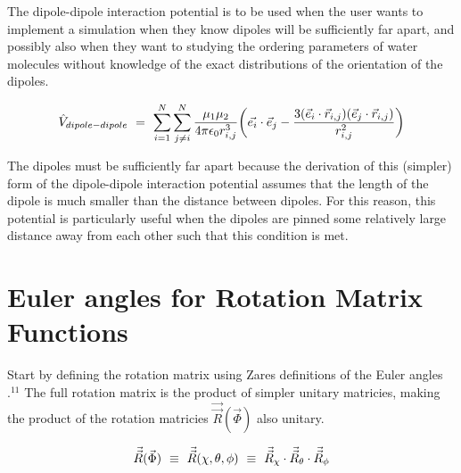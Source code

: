 \documentclass{ece}
\begin{document}
The dipole-dipole interaction potential is to be used when the user wants to implement a simulation when they know dipoles will be sufficiently far apart, and possibly also when they want to studying the ordering parameters of water molecules without knowledge of the exact distributions of the orientation of the dipoles. 

\begin{equation} \label{eq:69}
\hat{V}_{dipole-dipole} \hspace{0.125cm} = \hspace{0.125cm} \sum_{i = 1}^{N} \sum_{j \neq i}^{N} \frac{\mu_{1} \mu_{2}}{4 \pi \epsilon_{0} r_{i, j}^{3}} \bigg( \vec{e_i} \cdot \vec{e}_{j} - \frac{3(\vec{e}_{i} \cdot \vec{r}_{i, j})( \vec{e}_{j} \cdot \vec{r}_{i, j})}{r_{i, j}^{2}} \bigg)
\end{equation}

The dipoles must be sufficiently far apart because the derivation of this (simpler) form of the dipole-dipole interaction potential assumes that the length of the dipole is much smaller than the distance between dipoles. For this reason, this potential is particularly useful when the dipoles are pinned some relatively large distance away from each other such that this condition is met. 

\section{Euler angles for Rotation Matrix Functions}
\label{app:eulang}

Start by defining the rotation matrix using Zares definitions of the Euler angles \begin{math}.^{11} \end{math} The full rotation matrix is the product of simpler unitary matricies, making the product of the rotation matricies \begin{math} \vec{\vec{R}} ( \vec{\Phi} )  \end{math} also unitary.

\begin{equation}
    \vec{\vec{R}} ( \vec{\Phi} ) \hspace{0.125cm} \equiv \hspace{0.125cm} \vec{\vec{R}} ( \chi , \theta , \phi ) \hspace{0.125cm} \equiv \hspace{0.125cm}  \vec{\vec{R}}_{\chi} \cdot \vec{\vec{R}}_{\theta} \cdot \vec{\vec{R}}_{\phi} 
\end{equation}
\end{document}
